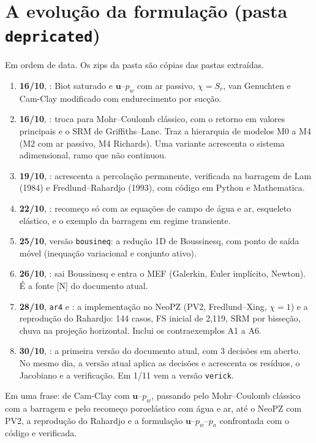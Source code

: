 \section{A evolução da formulação (pasta \texttt{depricated})}
\label{sec:historia}

Em ordem de data. Os zips da pasta são cópias das pastas extraídas.
\begin{enumerate}
  \item \textbf{16/10}, : Biot saturado e $\bm u$--$p_w$ com ar passivo, $\chi = S_r$,
    van Genuchten e Cam-Clay modificado com endurecimento por sucção.
  \item \textbf{16/10}, : troca para Mohr--Coulomb clássico, com o retorno em valores
    principais e o SRM de Griffiths--Lane. Traz a hierarquia de modelos M0 a M4 (M2 com ar passivo, M4 Richards). Uma
    variante acrescenta o sistema adimensional, ramo que não continuou.
  \item \textbf{19/10}, : acrescenta a percolação permanente, verificada
    na barragem de Lam (1984) e Fredlund--Rahardjo (1993), com código em Python e Mathematica.
  \item \textbf{22/10}, : recomeço só com as equações de campo de água e ar, esqueleto elástico,
    e o exemplo da barragem em regime transiente.
  \item \textbf{25/10}, versão \texttt{bousineq}: a redução 1D de Boussinesq, com ponto de saída móvel (inequação
    variacional e conjunto ativo).
  \item \textbf{26/10}, : sai Boussinesq e entra o MEF (Galerkin, Euler
    implícito, Newton). É a fonte [N] do documento atual.
  \item \textbf{28/10}, \texttt{ar4} e : a implementação no NeoPZ (PV2, Fredlund--Xing,
    $\chi = 1$) e a reprodução do Rahardjo: 144 casos, FS inicial de 2,119, SRM por bisseção, chuva na projeção
    horizontal. Inclui os contraexemplos A1 a A6.
  \item \textbf{30/10}, : a primeira versão do documento atual, com 3 decisões em aberto. No
    mesmo dia, a versão atual aplica as decisões e acrescenta os resíduos, o Jacobiano e a verificação. Em 1/11 vem a
    versão \texttt{verick}.
\end{enumerate}
Em uma frase: de Cam-Clay com $\bm u$--$p_w$, passando pelo Mohr--Coulomb clássico com a barragem e pelo recomeço
poroelástico com água e ar, até o NeoPZ com PV2, a reprodução do Rahardjo e a formulação $\bm u$--$p_w$--$p_a$
confrontada com o código e verificada.
